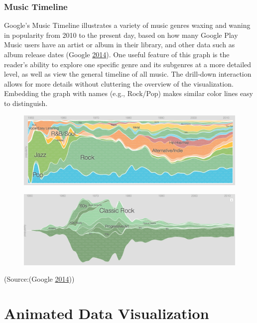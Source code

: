 \documentclass[]{book}
\begin{document}
\subsubsection{Music Timeline}\label{music-timeline}

Google's Music Timeline illustrates a variety of music genres waxing and
waning in popularity from 2010 to the present day, based on how many
Google Play Music users have an artist or album in their library, and
other data such as album release dates (Google
\protect\hyperlink{ref-google_music}{2014}). One useful feature of this
graph is the reader's ability to explore one specific genre and its
subgenres at a more detailed level, as well as view the general timeline
of all music. The drill-down interaction allows for more details without
cluttering the overview of the visualization. Embedding the graph with
names (e.g., Rock/Pop) makes similar color lines easy to distinguish.

\begin{figure}
\centering
\includegraphics{images/music_timeline.png}
\caption{}
\end{figure}

\begin{figure}
\centering
\includegraphics{images/music_timeline_rock.png}
\caption{}
\end{figure}

(Source:(Google \protect\hyperlink{ref-google_music}{2014}))

\section{Animated Data Visualization}\label{animated-data-visualization}
\end{document}
